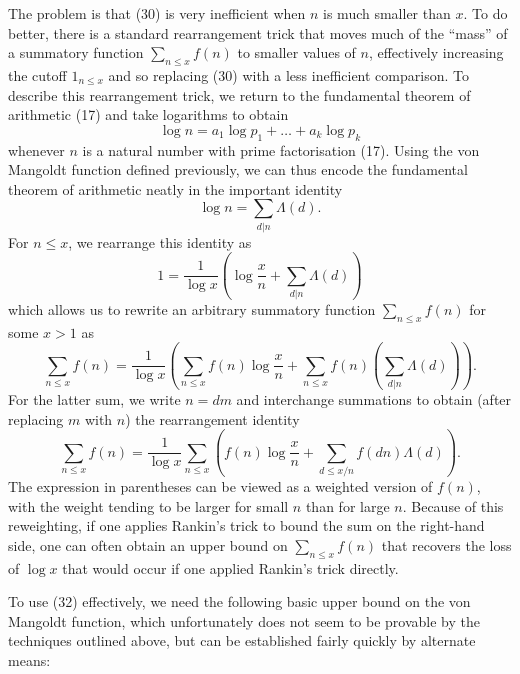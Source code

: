 \documentclass[10pt,reqno]{amsart}
\begin{document}
The problem is that (30) is very inefficient when $n$ is much smaller than $x$. To do better, there is a standard rearrangement trick that moves much of the “mass” of a summatory function $\sum_{n \leq x} f(n)$ to smaller values of $n$, effectively increasing the cutoff $1_{n \leq x}$ and so replacing (30) with a less inefficient comparison. To describe this rearrangement trick, we return to the fundamental theorem of arithmetic (17) and take logarithms to obtain
%
\[  \log n = a_1 \log p_1 + \dots + a_k \log p_k\]
%
whenever $n$ is a natural number with prime factorisation (17). Using the von Mangoldt function defined previously, we can thus encode the fundamental theorem of arithmetic neatly in the important identity
%
\begin{equation}   \log n = \sum_{d|n} \Lambda(d).\end{equation}
%
For $n \leq x$, we rearrange this identity as
%
\[  1 = \frac{1}{\log x} \left( \log \frac{x}{n} + \sum_{d|n} \Lambda(d) \right)\]
%
which allows us to rewrite an arbitrary summatory function $\sum_{n \leq x} f(n)$ for some $x > 1$ as
%
\[  \sum_{n \leq x} f(n) = \frac{1}{\log x} \left( \sum_{n \leq x} f(n) \log \frac{x}{n} + \sum_{n \leq x} f(n) \left(\sum_{d|n} \Lambda(d) \right) \right).\]
%
For the latter sum, we write $n = dm$ and interchange summations to obtain (after replacing $m$ with $n$) the rearrangement identity
%
\begin{equation}   \sum_{n \leq x} f(n) = \frac{1}{\log x} \sum_{n \leq x} \left( f(n) \log \frac{x}{n} + \sum_{d \leq x/n} f(dn) \Lambda(d) \right). \end{equation}
%
The expression in parentheses can be viewed as a weighted version of $f(n)$, with the weight tending to be larger for small $n$ than for large $n$. Because of this reweighting, if one applies Rankin’s trick to bound the sum on the right-hand side, one can often obtain an upper bound on $\sum_{n \leq x} f(n)$ that recovers the loss of $\log x$ that would occur if one applied Rankin’s trick directly.

To use (32) effectively, we need the following basic upper bound on the von Mangoldt function, which unfortunately does not seem to be provable by the techniques outlined above, but can be established fairly quickly by alternate means:
\end{document}
